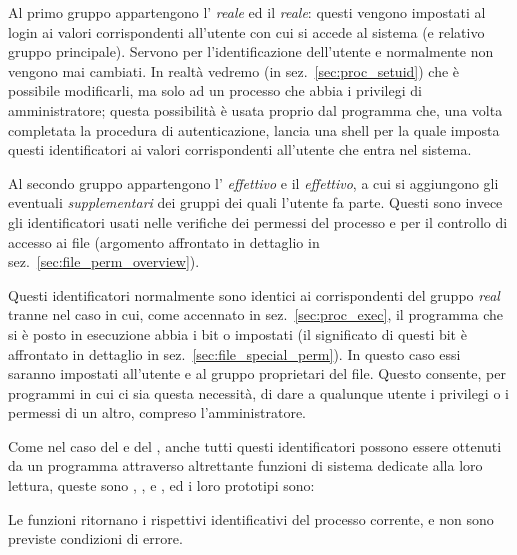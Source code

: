 Al primo gruppo appartengono l' \textsl{reale} ed il 
\textsl{reale}: questi vengono impostati al login ai valori corrispondenti
all'utente con cui si accede al sistema (e relativo gruppo principale).
Servono per l'identificazione dell'utente e normalmente non vengono mai
cambiati. In realtà vedremo (in sez.~\ref{sec:proc_setuid}) che è possibile
modificarli, ma solo ad un processo che abbia i privilegi di amministratore;
questa possibilità è usata proprio dal programma  che, una volta
completata la procedura di autenticazione, lancia una shell per la quale
imposta questi identificatori ai valori corrispondenti all'utente che entra
nel sistema.

Al secondo gruppo appartengono l' \textsl{effettivo} e il 
\textsl{effettivo}, a cui si aggiungono gli eventuali 
\textsl{supplementari} dei gruppi dei quali l'utente fa parte.  Questi sono
invece gli identificatori usati nelle verifiche dei permessi del processo e
per il controllo di accesso ai file (argomento affrontato in dettaglio in
sez.~\ref{sec:file_perm_overview}).

Questi identificatori normalmente sono identici ai corrispondenti del gruppo
\textit{real} tranne nel caso in cui, come accennato in
sez.~\ref{sec:proc_exec}, il programma che si è posto in esecuzione abbia i
bit  o  impostati (il significato di questi bit è
affrontato in dettaglio in sez.~\ref{sec:file_special_perm}). In questo caso
essi saranno impostati all'utente e al gruppo proprietari del file. Questo
consente, per programmi in cui ci sia questa necessità, di dare a qualunque
utente i privilegi o i permessi di un altro, compreso l'amministratore.

Come nel caso del  e del , anche tutti questi
identificatori possono essere ottenuti da un programma attraverso altrettante
funzioni di sistema dedicate alla loro lettura, queste sono ,
,  e , ed i loro prototipi sono:

\begin{funcproto}{ 
}
{Le funzioni ritornano i rispettivi identificativi del processo corrente, e
  non sono previste condizioni di errore.}
\end{funcproto}

